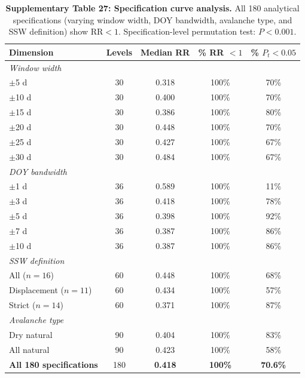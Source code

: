 \begin{table}[!ht]
\centering
\caption{\textbf{Supplementary Table 27: Specification curve analysis.}
All 180 analytical specifications (varying window width, DOY bandwidth, avalanche type, and SSW definition) show $\mathrm{RR} < 1$. Specification-level permutation test: $P < 0.001$.}
\label{tab:spec_curve}
\small
\begin{tabular}{lcccc}
\toprule
Dimension & Levels & Median RR & \% RR $< 1$ & \% $P_t < 0.05$ \\
\midrule
\multicolumn{5}{l}{\textit{Window width}} \\
$\pm$5 d & 30 & 0.318 & 100\% & 70\% \\
$\pm$10 d & 30 & 0.400 & 100\% & 70\% \\
$\pm$15 d & 30 & 0.386 & 100\% & 80\% \\
$\pm$20 d & 30 & 0.448 & 100\% & 70\% \\
$\pm$25 d & 30 & 0.427 & 100\% & 67\% \\
$\pm$30 d & 30 & 0.484 & 100\% & 67\% \\
\midrule
\multicolumn{5}{l}{\textit{DOY bandwidth}} \\
$\pm$1 d & 36 & 0.589 & 100\% & 11\% \\
$\pm$3 d & 36 & 0.418 & 100\% & 78\% \\
$\pm$5 d & 36 & 0.398 & 100\% & 92\% \\
$\pm$7 d & 36 & 0.387 & 100\% & 86\% \\
$\pm$10 d & 36 & 0.387 & 100\% & 86\% \\
\midrule
\multicolumn{5}{l}{\textit{SSW definition}} \\
All ($n = 16$) & 60 & 0.448 & 100\% & 68\% \\
Displacement ($n = 11$) & 60 & 0.434 & 100\% & 57\% \\
Strict ($n = 14$) & 60 & 0.371 & 100\% & 87\% \\
\midrule
\multicolumn{5}{l}{\textit{Avalanche type}} \\
Dry natural & 90 & 0.404 & 100\% & 83\% \\
All natural & 90 & 0.423 & 100\% & 58\% \\
\midrule
\textbf{All 180 specifications} & 180 & \textbf{0.418} & \textbf{100\%} & \textbf{70.6\%} \\
\bottomrule
\end{tabular}
\end{table}

